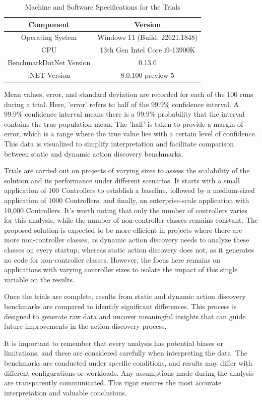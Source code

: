 \begin{table}[h!]
\centering
\begin{tabular}{|c|c|}
\hline
\textbf{Component} & \textbf{Version} \\
\hline
Operating System & Windows 11 (Build: 22621.1848) \\
\hline
CPU & 13th Gen Intel Core i9-13900K \\
\hline
BenchmarkDotNet Version & 0.13.0 \\
\hline
.NET Version & 8.0.100 preview 5 \\
\hline
\end{tabular}
\caption{Machine and Software Specifications for the Trials}
\label{table:specifications}
\end{table}

Mean values, error, and standard deviation are recorded for each of the 100 runs during a trial. Here, 'error' refers to half of the 99.9\% confidence interval. A 99.9\% confidence interval means there is a 99.9\% probability that the interval contains the true population mean. The 'half' is taken to provide a margin of error, which is a range where the true value lies with a certain level of confidence. This data is visualized to simplify interpretation and facilitate comparison between static and dynamic action discovery benchmarks.

Trials are carried out on projects of varying sizes to assess the scalability of the solution and its performance under different scenarios. It starts with a small application of 100 Controllers to establish a baseline, followed by a medium-sized application of 1000 Controllers, and finally, an enterprise-scale application with 10,000 Controllers. It's worth noting that only the number of controllers varies for this analysis, while the number of non-controller classes remains constant. The proposed solution is expected to be more efficient in projects where there are more non-controller classes, as dynamic action discovery needs to analyze these classes on every startup, whereas static action discovery does not, as it generates no code for non-controller classes. However, the focus here remains on applications with varying controller sizes to isolate the impact of this single variable on the results.

Once the trials are complete, results from static and dynamic action discovery benchmarks are compared to identify significant differences. This process is designed to generate raw data and uncover meaningful insights that can guide future improvements in the action discovery process.

It is important to remember that every analysis has potential biases or limitations, and these are considered carefully when interpreting the data. The benchmarks are conducted under specific conditions, and results may differ with different configurations or workloads. Any assumptions made during the analysis are transparently communicated. This rigor ensures the most accurate interpretation and valuable conclusions.
